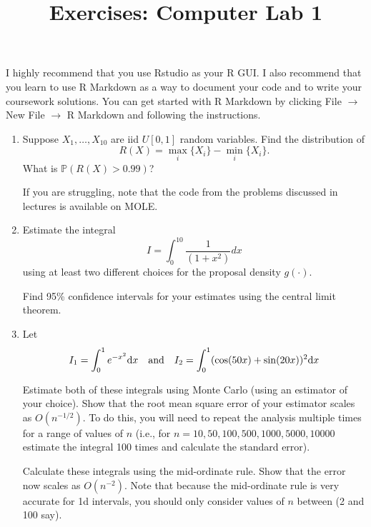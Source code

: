 \documentclass[12pt,a4paper]{article}
\title{Exercises: Computer Lab 1}
\begin{document}
\maketitle



I highly recommend that you use Rstudio as your R GUI. I also recommend that you learn to use R Markdown as a way to document your code and to write your coursework solutions. You can get started with R Markdown by clicking File $\rightarrow$ New File $\rightarrow$ R Markdown and following the instructions.

\begin{enumerate}
\item 

Suppose $X_1, \ldots, X_{10}$ are iid $U[0,1]$ random variables. Find the distribution of 
$$R(X) = \max_i\{X_i\} - \min_i \{X_i\}.$$
What is $\mathbb{P}(R(X) > 0.99)$?

If you are struggling, note that the code from the problems discussed in lectures is available on MOLE.


\item Estimate the integral 
$$I = \int_{0}^{10}\frac{1}{(1+x^2)} dx$$ 
using at least two different choices for the proposal density  $g(\cdot)$.

Find 95\% confidence intervals for your estimates using the central limit theorem.


\item Let 
$$I_1 = \int_0^1 e^{-x^2} {\rm d} x \quad \mbox{and}\quad I_2 = \int_0^1 (\cos(50x) + \sin(20x))^2 {\rm d} x$$

Estimate both of these integrals using Monte Carlo (using an estimator of your choice). Show that the root mean square error of your estimator scales as $O(n^{-1/2})$. To do this, you will need to repeat the analysis multiple times for a range of values of $n$ (i.e., for $n=10,50,100,500,1000,5000,10000$ estimate the integral 100 times and calculate the standard error).

Calculate these integrals using the mid-ordinate rule. Show that the error now scales as $O(n^{-2})$. Note that because the mid-ordinate rule is very accurate for 1d intervals, you should only consider values of $n$ between (2 and 100 say).


\end{enumerate}
\end{document}
